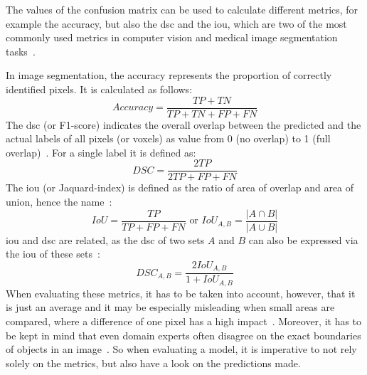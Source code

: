 The values of the confusion matrix can be used to calculate different metrics, for example the accuracy, but also the \gls{dsc} and the \gls{iou}, which are two of the most commonly used metrics in computer vision and medical image segmentation tasks~\autocite{Reinke2022}.

In image segmentation, the accuracy represents the proportion of correctly identified pixels.
It is calculated as follows:
\begin{equation}
    Accuracy = \frac{TP + TN}{TP + TN + FP + FN}
    \label{eq:accuracy}
\end{equation}
The \gls{dsc} (or F1-score) indicates the overall overlap between the predicted and the actual labels of all pixels (or voxels) as value from 0 (no overlap) to 1 (full overlap)~\autocite{Reinke2022}.
For a single label it is defined as:
\begin{equation}
    DSC = \frac{2TP}{2TP + FP + FN}
    \label{eq:dsc}
\end{equation}
The \gls{iou} (or Jaquard-index) is defined as the ratio of area of overlap and area of union, hence the name~\autocite{Reinke2022}:
\begin{equation}
    IoU = \frac{TP}{TP + FP + FN} \text{ or } IoU_{A,B} = \frac{|A \cap B|}{|A \cup B|}
    \label{eq:IoU}
\end{equation}
\gls{iou} and \gls{dsc} are related, as the \gls{dsc} of two sets $A$ and $B$ can also be expressed via the \gls{iou} of these sets~\autocite{Reinke2022}:
\begin{equation}
    DSC_{A,B} = \frac{2IoU_{A,B}}{1 + IoU_{A,B}}
    \label{eq:dsc-IoU}
\end{equation}
When evaluating these metrics, it has to be taken into account, however, that it is just an average and it may be especially misleading when small areas are compared, where a difference of one pixel has a high impact~\autocite{Reinke2022}.
Moreover, it has to be kept in mind that even domain experts often disagree on the exact boundaries of objects in an image~\autocite{Webb2021}.
So when evaluating a model, it is imperative to not rely solely on the metrics, but also have a look on the predictions made.

